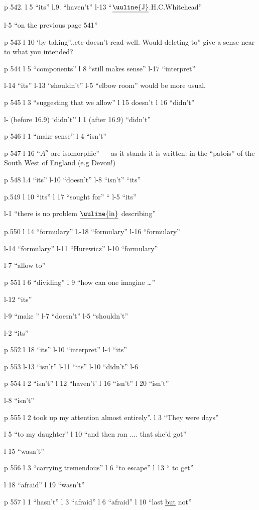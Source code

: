 p 542. l 5 ``its'' \quad l.9. ``haven't'' \quad l-13 ``$\underline{\text{\uuline{J}}}$.H.C.Whitehead''

l-5 ``on the previous page 541''

p 543 l 10 `by taking''..etc doesn't read well. Would deleting to'' give  a sense near to what you intended?

p 544 l 5 ``components'' \quad l 8 ``still makes sense'' \quad l-17 ``interpret''

l-14 ``its'' \quad l-13 ``shouldn't'' \quad l-5 ``elbow room'' would be more usual.

p 545 l 3 ``suggesting that we allow'' \quad l 15 doesn't \quad l 16 ``didn't''

l- (before 16.9) `didn't'' \quad l 1 (after 16.9) ``didn't''

p 546 l 1 ``make sense'' \quad l 4 ``isn't''

p 547 l 16 ``$A^{n}$ are isomorphic'' --- as it stands it is written: in the ``patois'' of the South West of England (e.g Devon!)

p 548 l.4 ``its'' \quad l-10 ``doesn't'' \quad l-8 ``isn't'' ``its''

p.549 l 10 ``its'' \quad l 17 ``sought for'' \quad {} `` \quad l-5 ``its''

l-1 ``there is no problem $\underline{\text{\uuline{in}}}$ describing''


p.550 l 14 ``formulary'' \quad l.-18 ``formulary'' \quad l-16 ``formulary''

l-14 ``formulary'' \quad l-11 ``Hurewicz'' \quad l-10 ``formulary''

l-7 ``allow  to''

p 551 l 6 ``dividing'' \quad l 9 ``how can one imagine \ldots''

l-12 ``its''

l-9 ``make '' \quad l-7 ``doesn't'' \quad l-5 ``shouldn't''

l-2 ``its''

p 552 l 18 ``its'' \quad l-10 ``interpret'' \quad l-4 ``its''

p 553 l-13 ``isn't'' \quad l-11 ``its'' \quad l-10 ``didn't'' \quad l-6

p 554 l 2 ``isn't'' \quad l 12 ``haven't' \quad l 16 ``isn't'' \quad l 20 ``isn't''

l-8 ``isn't''

p 555 l 2 took up my attention almost entirely''. \quad l 3 ``They were days''

l 5 ``to my daughter'' \quad l 10 ``and then ran .... that she'd got''

l 15 ``wasn't''

p 556 l 3 ``carrying tremendous'' \quad l 6 ``to escape'' \quad l 13 `` to get''

l 18 ``afraid'' \quad l 19 ``wasn't''

p 557 l 1 ``hasn't'' \quad l 3 ``afraid'' \quad l 6 ``afraid'' \quad l 10 ``last \uline{but} not''
